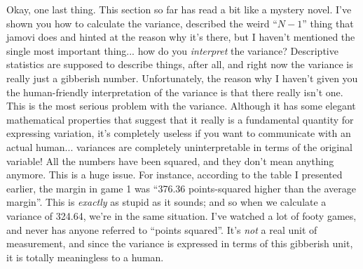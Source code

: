 Okay, one last thing. This section so far has read a bit like a mystery novel. I've shown you how to calculate the variance, described the weird ``$N-1$'' thing that jamovi does and hinted at the reason why it's there, but I haven't mentioned the single most important thing... how do you {\it interpret} the variance? Descriptive statistics are supposed to describe things, after all, and right now the variance is really just a gibberish number. Unfortunately, the reason why I haven't given you the human-friendly interpretation of the variance is that there really isn't one. This is the most serious problem with the variance. Although it has some elegant mathematical properties that suggest that it really is a fundamental quantity for expressing variation, it's completely useless if you want to communicate with an actual human... variances are completely uninterpretable in terms of the original variable! All the numbers have been squared, and they don't mean anything anymore. This is a huge issue. For instance, according to the table I presented earlier, the margin in game 1 was ``376.36 points-squared higher than the average margin''. This is {\it exactly} as stupid as it sounds; and so when we calculate a variance of 324.64, we're in the same situation. I've watched a lot of footy games, and never has anyone referred to ``points squared''. It's {\it not} a real unit of measurement, and since the variance is expressed in terms of this gibberish unit, it is totally meaningless to a human.



